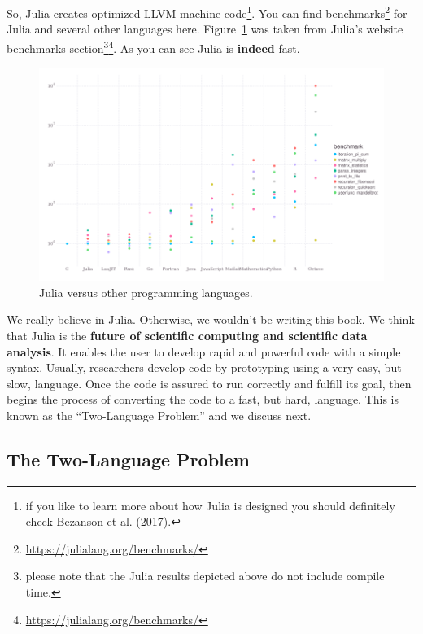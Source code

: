 \documentclass[
  notoc %
]{tufte-book}
\DeclareRobustCommand{\href}[2]{#2\footnote{\url{#1}}}
\begin{document}
So, Julia creates optimized LLVM machine code\footnote{if you like to
  learn more about how Julia is designed you should definitely check
  \protect\hyperlink{ref-bezanson2017julia}{Bezanson et al.}
  (\protect\hyperlink{ref-bezanson2017julia}{2017}).}. You can find
\href{https://julialang.org/benchmarks/}{benchmarks} for Julia and
several other languages here. Figure~\ref{fig:benchmarks} was taken from
\href{https://julialang.org/benchmarks/}{Julia's website benchmarks
section\footnote{please note that the Julia results depicted above do
  not include compile time.}}. As you can see Julia is \textbf{indeed}
fast.

\begin{figure}
\hypertarget{fig:benchmarks}{%
\centering
\includegraphics{images/benchmarks.png}
\caption{Julia versus other programming
languages.}\label{fig:benchmarks}
}
\end{figure}

We really believe in Julia. Otherwise, we wouldn't be writing this book.
We think that Julia is the \textbf{future of scientific computing and
scientific data analysis}. It enables the user to develop rapid and
powerful code with a simple syntax. Usually, researchers develop code by
prototyping using a very easy, but slow, language. Once the code is
assured to run correctly and fulfill its goal, then begins the process
of converting the code to a fast, but hard, language. This is known as
the ``Two-Language Problem'' and we discuss next.

\hypertarget{sec:two_language}{%
\subsection{The Two-Language Problem}\label{sec:two_language}}
\end{document}
